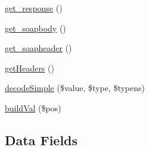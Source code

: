 \begin{DoxyCompactItemize}
\hyperlink{classnusoap__parser_acf3c69045efc130d3a325c26bd6ac5d0}{get\+\_\+response} ()
\item 
\hyperlink{classnusoap__parser_afa83e4a32b391ea624d012488333c6b1}{get\+\_\+soapbody} ()
\item 
\hyperlink{classnusoap__parser_aeee8c98a38a95c143f807ede81dc06b7}{get\+\_\+soapheader} ()
\item 
\hyperlink{classnusoap__parser_a157e0005d82edaa21cbea07fdc5c62da}{get\+Headers} ()
\item 
\hyperlink{classnusoap__parser_a9094260815e81487fef378ac6222e9a9}{decode\+Simple} (\$value, \$type, \$typens)
\item 
\hyperlink{classnusoap__parser_a8a4609375662042387aa159de2edd196}{build\+Val} (\$pos)
\end{DoxyCompactItemize}
\subsection*{Data Fields}
